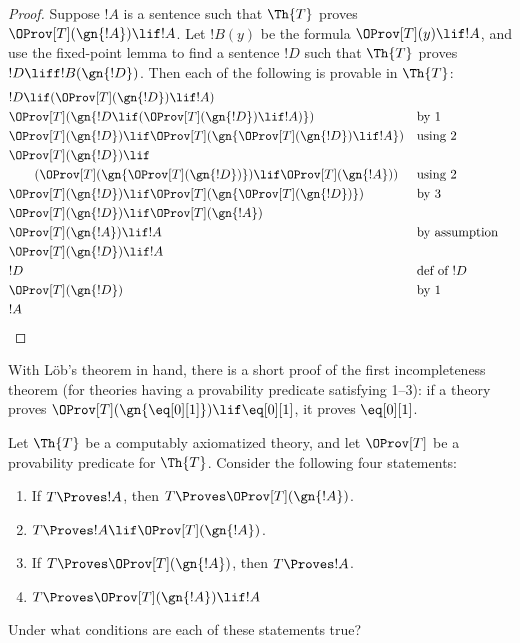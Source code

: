 \documentclass[../../include/open-logic-section]{subfiles}
\begin{document}
\begin{proof}
Suppose $!A$ is a sentence such that $\Th{T}$ proves
$\OProv[T](\gn{!A}) \lif !A$. Let $!B(y)$ be the formula $\OProv[T](y)
\lif !A$, and use the fixed-point lemma to find a sentence $!D$
such that $\Th{T}$ proves $!D \liff !B(\gn{!D})$. Then each of the
following is provable in $\Th{T}$:
\begin{align*}
& !D \lif (\OProv[T](\gn{!D}) \lif !A) \\
& \OProv[T](\gn{!D \lif (\OProv[T](\gn{!D}) \lif !A)}) && \text{by 1} \\
& \OProv[T](\gn{!D}) \lif \OProv[T](\gn{\OProv[T](\gn{!D}) \lif !A})
  && \text{using 2} \\
& \OProv[T](\gn{!D}) \lif \\
&\qquad(\OProv[T](\gn{\OProv[T](\gn{!D})}) \lif \OProv[T](\gn{!A}))
  && \text{using 2} \\
& \OProv[T](\gn{!D}) \lif \OProv[T](\gn{\OProv[T](\gn{!D})}) 
  && \text{by 3} \\
& \OProv[T](\gn{!D}) \lif \OProv[T](\gn{!A})  \\
& \OProv[T](\gn{!A}) \lif !A && \text{by assumption} \\
& \OProv[T](\gn{!D}) \lif !A \\
& !D && \text{def of $!D$} \\
& \OProv[T](\gn{!D}) && \text{by 1} \\
& !A \\
\end{align*}
\end{proof}

With L\"ob's theorem in hand, there is a short proof of the first
incompleteness theorem (for theories having a provability predicate
satisfying 1--3): if a theory proves $\OProv[T](\gn{\eq[0][1]}) \lif
\eq[0][1]$, it proves $\eq[0][1]$. 


\begin{prob}
Let $\Th{T}$ be a computably axiomatized theory, and
let $\OProv[T]$ be a provability predicate for $\Th{T}$. Consider the
following four statements:
\begin{enumerate}
\item If $T \Proves !A$, then $T \Proves \OProv[T](\gn{!A})$.
\item $T \Proves !A \lif \OProv[T](\gn{!A})$.
\item If $T \Proves \OProv[T](\gn{!A})$, then $T \Proves !A$.
\item $T \Proves \OProv[T](\gn{!A}) \lif !A$
\end{enumerate}
Under what conditions are each of these statements true?
\end{prob}
\end{document}
